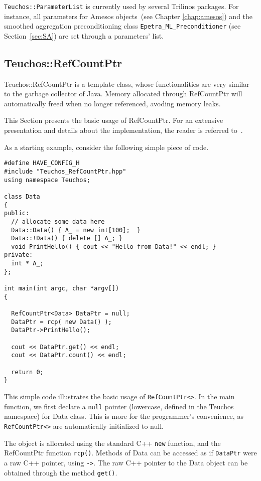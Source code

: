 \begin{remark}
  \verb!Teuchos::ParameterList! is currently used by several Trilinos
  packages. For instance, all parameters for Amesos objects~(see Chapter
  \ref{chap:amesos}) and the smoothed aggregation preconditioning class
  \verb!Epetra_ML_Preconditioner! (see Section~\ref{sec:SA}) are set
  through a parameters' list.
\end{remark}



\subsection{Teuchos::RefCountPtr}
\label{sec:teuchos:RefCountPtr}

Teuchos::RefCountPtr is a template class, whose functionalities are very
similar to the garbage collector of Java. Memory allocated through
RefCountPtr will automatically freed when no longer referenced, avoding
memory leaks.

This Section presents the basic usage of RefCountPtr. For an extensive
presentation and details about the implementation, the reader is
referred to~\cite{RefCountPtr-guide}. 

As a starting example, consider the following simple piece of
code. 
\begin{verbatim}
#define HAVE_CONFIG_H
#include "Teuchos_RefCountPtr.hpp"
using namespace Teuchos;

class Data 
{
public:
  // allocate some data here
  Data::Data() { A_ = new int[100];  }
  Data::!Data() { delete [] A_; }
  void PrintHello() { cout << "Hello from Data!" << endl; }
private:
  int * A_;
};

int main(int argc, char *argv[]) 
{

  RefCountPtr<Data> DataPtr = null;
  DataPtr = rcp( new Data() );
  DataPtr->PrintHello();

  cout << DataPtr.get() << endl;
  cout << DataPtr.count() << endl;

  return 0;
}
\end{verbatim}
This simple code illustrates the basic usage of \verb!RefCountPtr<>!. In
the main function, we first declare a \verb!null! pointer (lowercase,
defined in the Teuchos namespace) for Data class. This is more for the
programmer's convenience, as \verb!RefCountPtr<>! are automatically
initialized to null.

The object is allocated using the standard C++ \verb!new! function, and
the RefCountPtr function \verb!rcp()!.  Methods of Data can be accessed
as if \verb!DataPtr! were a raw C++ pointer, using \verb!->!.  The raw
C++ pointer to the Data object can be obtained through the method
\verb!get()!.

